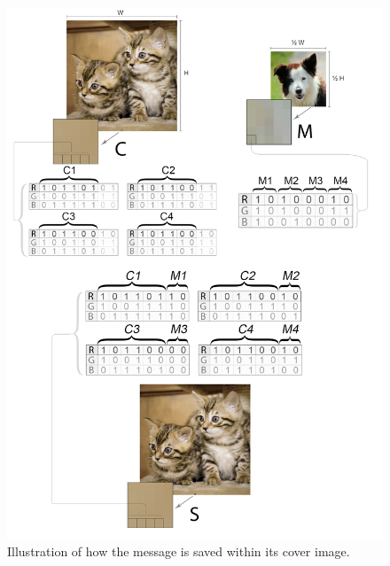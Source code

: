 \begin{figure}
	\centering
	\includegraphics[width=1\textwidth]{figures/hundikatgrafik.png}
	\caption{Illustration of how the message is saved within its cover image.}
	\label{fig:hundigrafik}
\end{figure}



